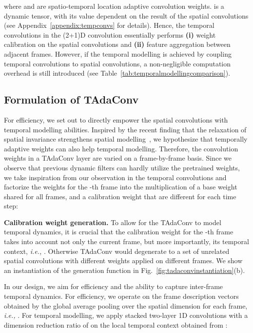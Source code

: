 \documentclass{article} \usepackage{iclr2022_conference,times}
\begin{document}
\noindent where  and  are spatio-temporal location adaptive convolution weights.  is a dynamic tensor, with its value dependent on the result of the spatial convolutions (see Appendix~\ref{appendix:tempconvs} for details). Hence, the temporal convolutions in the (2+1)D convolution essentially performs \textbf{(i)} weight calibration on the spatial convolutions and \textbf{(ii)} feature aggregation between adjacent frames. 
However, if the temporal modelling is achieved by coupling temporal convolutions to spatial convolutions, a non-negligible computation overhead is still introduced (see Table~\ref{tab:temporalmodellingcomparison}). 

\subsection{Formulation of TAdaConv}
\label{Sec:TempVariance}
For efficiency, we set out to directly empower the spatial convolutions with temporal modelling abilities. 
Inspired by the recent finding that the relaxation of spatial invariance strengthens spatial modelling~\citep{ddf,lrlc}, we hypothesize that temporally adaptive weights can also help temporal modelling. 
Therefore, the convolution weights in a TAdaConv layer are varied on a frame-by-frame basis.
Since we observe that previous dynamic filters can hardly utilize the pretrained weights, we take inspiration from our observation in the temporal convolutions and factorize the weights for the -th frame  into the multiplication of a base weight  shared for all frames, and a calibration weight  that are different for each time step:

\textbf{Calibration weight generation. }
To allow for the TAdaConv to model temporal dynamics, it is crucial that the calibration weight  for the -th frame takes into account not only the current frame, but more importantly, its temporal context, \textit{i.e.,} .
Otherwise TAdaConv would degenerate to a set of unrelated spatial convolutions with different weights applied on different frames.
We show an instantiation of the generation function  in Fig.~\ref{fig:tadaconvinstantiation}(b).

In our design, we aim for efficiency and the ability to capture inter-frame temporal dynamics. 
For efficiency, we operate on the frame description vectors  obtained by the global average pooling over the spatial dimension  for each frame, \textit{i.e.,} .
For temporal modelling, we apply stacked two-layer 1D convolutions  with a dimension reduction ratio of  on the local temporal context  obtained from :
\end{document}
